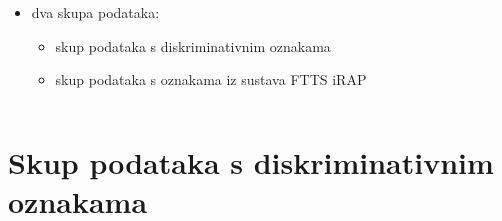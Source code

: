 \documentclass{beamer}
\begin{document}
\begin{frame}
\begin{columns}
\begin{column}{0.5\textwidth}
\begin{itemize}
 \item dva skupa podataka:
 \begin{itemize}
  \item skup podataka s diskriminativnim oznakama
  \item skup podataka s oznakama iz sustava FTTS iRAP
 \end{itemize}

\end{itemize}


\end{column}
\end{columns}
 
\end{frame}

\section{Skup podataka s diskriminativnim oznakama}
\end{document}
